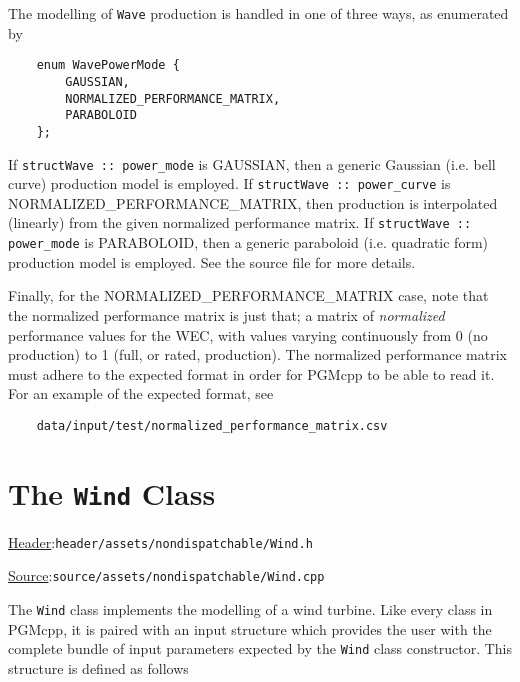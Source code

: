 \documentclass[12pt, letterpaper]{report}
\begin{document}
\newpage 
The modelling of \texttt{Wave} production is handled in one of three ways, as enumerated by

\begin{verbatim}
    enum WavePowerMode {
        GAUSSIAN,
        NORMALIZED_PERFORMANCE_MATRIX,
        PARABOLOID
    };
\end{verbatim}

\noindent If \texttt{structWave :: power\_mode} is GAUSSIAN, then a generic Gaussian (i.e. bell curve) production model is employed. If \texttt{structWave :: power\_curve} is\\NORMALIZED\_PERFORMANCE\_MATRIX, then production is interpolated (linearly) from the given normalized performance matrix. If \texttt{structWave :: power\_mode} is PARABOLOID, then a generic paraboloid (i.e. quadratic form) production model is employed. See the source file for more details. \par 
Finally, for the NORMALIZED\_PERFORMANCE\_MATRIX case, note that the normalized performance matrix is just that; a matrix of \textit{normalized} performance values for the WEC, with values varying continuously from 0 (no production) to 1 (full, or rated, production). The normalized performance matrix must adhere to the expected format in order for PGMcpp to be able to read it. For an example of the expected format, see

\begin{verbatim}
    data/input/test/normalized_performance_matrix.csv
\end{verbatim}

\section{The \texttt{Wind} Class}

\begin{large}
\noindent\underline{Header}:\quad\texttt{header/assets/nondispatchable/Wind.h}\par
\noindent\underline{Source}:\quad\texttt{source/assets/nondispatchable/Wind.cpp}\par
\end{large}
\vspace{5mm}

The \texttt{Wind} class implements the modelling of a wind turbine. Like every class in PGMcpp, it is paired with an input structure which provides the user with the complete bundle of input parameters expected by the \texttt{Wind} class constructor. This structure is defined as follows
\end{document}
